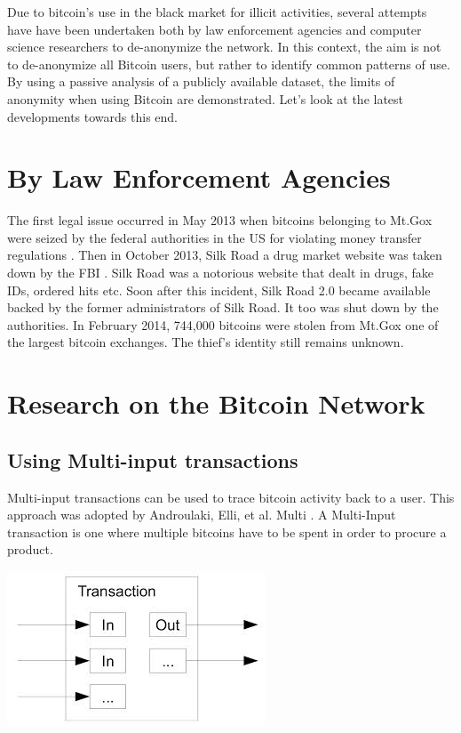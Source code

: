 Due to bitcoin's use in the black market for illicit activities, several attempts have have been undertaken both by law enforcement agencies and computer science researchers to de-anonymize the network. In this context, the aim is not to de-anonymize all Bitcoin users, but rather to identify common patterns of use. By using a passive analysis of a publicly available dataset, the limits of anonymity when using Bitcoin are demonstrated. Let’s look at the latest developments towards this end.

\section{By Law Enforcement Agencies}
The first legal issue occurred in May 2013 when bitcoins belonging to Mt.Gox were seized by the federal authorities in the US for violating money transfer regulations \cite{seize}. Then in October 2013, Silk Road a drug market website was taken down by the FBI \cite{silk}. Silk Road was a notorious website that dealt in drugs, fake IDs, ordered hits etc. Soon after this incident, Silk Road 2.0 became available backed by the former administrators of Silk Road. It too was shut down by the authorities. In February 2014, 744,000 bitcoins were stolen from Mt.Gox one of the largest bitcoin exchanges. The thief's identity still remains unknown. 

\section{Research on the Bitcoin Network}

\subsection{Using Multi-input transactions}
Multi-input transactions can be used to trace bitcoin activity back to a user.  This approach was adopted by Androulaki, Elli, et al. Multi \cite{anony}. A Multi-Input transaction is one where multiple bitcoins have to be spent in order to procure a product.

\begin{center}
\includegraphics[scale=0.5]{images/multi.jpeg}
\end{center}

